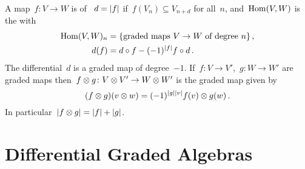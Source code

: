 \documentclass[a4paper,10pt,headings=standardclasses]{scrartcl}
\begin{document}
A map~$f \colon V \to W$ is  of ~$d = \lvert f\rvert$ if~$f(V_n) \subseteq V_{n+d}$ for all~$n$, and~$\operatorname{Hom}(V,W)$ is the {\dgvs} with
\begin{align*}
  \operatorname{Hom}(V,W)_n
  &=
  \{
    \text{graded maps~$V \to W$ of degree~$n$}
  \} \,,
  \\
  d(f)
  &=
  d \circ f - (-1)^{\lvert f\rvert} f \circ d \,.
\end{align*}
The differential~$d$ is a graded map of degree~$-1$.
If~$f \colon V \to V'$,~$g \colon W \to W'$ are graded maps then~$f \otimes g \colon V \otimes V' \to W \otimes W'$ is the graded map given by
\[
  (f \otimes g)(v \otimes w)
  =
  (-1)^{\lvert g\rvert \lvert v\rvert}
  f(v) \otimes g(w) \,.
\]
In particular~$\lvert f \otimes g\rvert = \lvert f\rvert + \lvert g\rvert$.







\section{Differential Graded Algebras}
\end{document}
